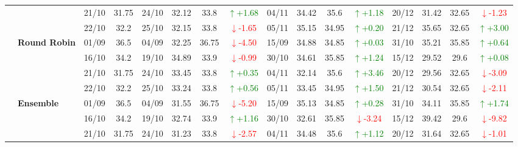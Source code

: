 {\begin{longtable}{llcc|cccc|cccc|cccc}
&
& 21/10 & 31.75 & 24/10 & 32.12 & 33.8 & \textcolor{green}{\(\uparrow\)+1.68} & 04/11 & 34.42 & 35.6 & \textcolor{green}{\(\uparrow\)+1.18} & 20/12 & 31.42 & 32.65 & \textcolor{red}{\(\downarrow\)-1.23} \\

&
& 22/10 & 32.2 & 25/10 & 32.15 & 33.8 & \textcolor{red}{\(\downarrow\)-1.65} & 05/11 & 35.15 & 34.95 & \textcolor{green}{\(\uparrow\)+0.20} & 21/12 & 35.65 & 32.65 & \textcolor{green}{\(\uparrow\)+3.00} \\
\cmidrule(lr){2-16}


& \textbf{Round Robin}
& 01/09 & 36.5 & 04/09 & 32.25 & 36.75 & \textcolor{red}{\(\downarrow\)-4.50} & 15/09 & 34.88 & 34.85 & \textcolor{green}{\(\uparrow\)+0.03} & 31/10 & 35.21 & 35.85 & \textcolor{green}{\(\uparrow\)+0.64} \\

&
& 16/10 & 34.2 & 19/10 & 34.89 & 33.9 & \textcolor{red}{\(\downarrow\)-0.99} & 30/10 & 34.61 & 35.85 & \textcolor{green}{\(\uparrow\)+1.24} & 15/12 & 29.52 & 29.6 & \textcolor{green}{\(\uparrow\)+0.08} \\

&
& 21/10 & 31.75 & 24/10 & 33.45 & 33.8 & \textcolor{green}{\(\uparrow\)+0.35} & 04/11 & 32.14 & 35.6 & \textcolor{green}{\(\uparrow\)+3.46} & 20/12 & 29.56 & 32.65 & \textcolor{red}{\(\downarrow\)-3.09} \\

&
& 22/10 & 32.2 & 25/10 & 33.24 & 33.8 & \textcolor{green}{\(\uparrow\)+0.56} & 05/11 & 33.45 & 34.95 & \textcolor{green}{\(\uparrow\)+1.50} & 21/12 & 30.54 & 32.65 & \textcolor{red}{\(\downarrow\)-2.11} \\
\cmidrule(lr){2-16}



& \textbf{Ensemble}
& 01/09 & 36.5 & 04/09 & 31.55 & 36.75 & \textcolor{red}{\(\downarrow\)-5.20} & 15/09 & 35.13 & 34.85 & \textcolor{green}{\(\uparrow\)+0.28} & 31/10 & 34.11 & 35.85 & \textcolor{green}{\(\uparrow\)+1.74} \\

&
& 16/10 & 34.2 & 19/10 & 32.74 & 33.9 & \textcolor{green}{\(\uparrow\)+1.16} & 30/10 & 32.61 & 35.85 & \textcolor{red}{\(\downarrow\)-3.24} & 15/12 & 39.42 & 29.6 & \textcolor{red}{\(\downarrow\)-9.82} \\

&
& 21/10 & 31.75 & 24/10 & 31.23 & 33.8 & \textcolor{red}{\(\downarrow\)-2.57} & 04/11 & 34.48 & 35.6 & \textcolor{green}{\(\uparrow\)+1.12} & 20/12 & 31.64 & 32.65 & \textcolor{red}{\(\downarrow\)-1.01} \\


\end{longtable}}
